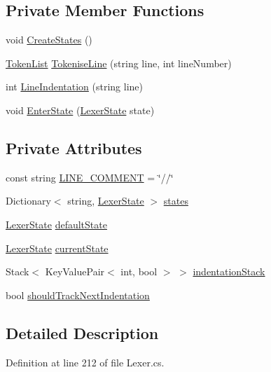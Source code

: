 \subsection*{Private Member Functions}
\begin{DoxyCompactItemize}
\item 
void \hyperlink{a00127_a646081a52b241abaafe5e0cfaeafd751}{Create\-States} ()
\item 
\hyperlink{a00175}{Token\-List} \hyperlink{a00127_a20b63f6ef434f6a40fd388f262f03fa8}{Tokenise\-Line} (string line, int line\-Number)
\item 
int \hyperlink{a00127_a4079b10b099e5d85f5482f9e7eac4179}{Line\-Indentation} (string line)
\item 
void \hyperlink{a00127_ad3ef08f822b310d9864774b057b96995}{Enter\-State} (\hyperlink{a00128}{Lexer\-State} state)
\end{DoxyCompactItemize}
\subsection*{Private Attributes}
\begin{DoxyCompactItemize}
\item 
const string \hyperlink{a00127_a29c457125cc4876f8571f5d9afa372e2}{L\-I\-N\-E\-\_\-\-C\-O\-M\-M\-E\-N\-T} = \char`\"{}//\char`\"{}
\item 
Dictionary$<$ string, \hyperlink{a00128}{Lexer\-State} $>$ \hyperlink{a00127_a2c65c0ba90f973e459583badefef216a}{states}
\item 
\hyperlink{a00128}{Lexer\-State} \hyperlink{a00127_a16b5dbf27a377cde5e8ba0eaa05b5710}{default\-State}
\item 
\hyperlink{a00128}{Lexer\-State} \hyperlink{a00127_ac90b7dce8103425a148f9e8588f14137}{current\-State}
\item 
Stack$<$ Key\-Value\-Pair$<$ int, bool $>$ $>$ \hyperlink{a00127_a6631a1b1a9109258ab18927e7587ff9b}{indentation\-Stack}
\item 
bool \hyperlink{a00127_ac670aac2245cbd4694dfbd5b69313218}{should\-Track\-Next\-Indentation}
\end{DoxyCompactItemize}


\subsection{Detailed Description}


Definition at line 212 of file Lexer.\-cs.



